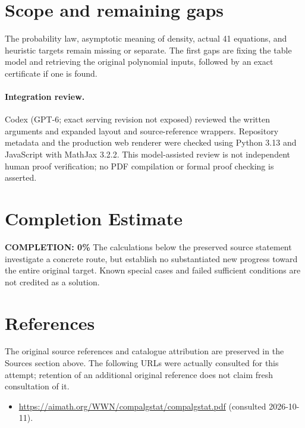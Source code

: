 \documentclass[11pt]{article}
\begin{document}
\section{Scope and remaining gaps}
The probability law, asymptotic meaning of density, actual 41 equations,
and heuristic targets remain missing or separate. The first gaps are fixing
the table model and retrieving the original polynomial inputs, followed by
an exact certificate if one is found.
\paragraph{Integration review.} Codex (GPT-6; exact serving revision not exposed) reviewed the written arguments and expanded layout and source-reference wrappers. Repository metadata and the production web renderer were checked using Python 3.13 and JavaScript with MathJax 3.2.2. This model-assisted review is not independent human proof verification; no PDF compilation or formal proof checking is asserted.

\section{Completion Estimate}
\noindent\textbf{COMPLETION: 0\%}
The calculations below the preserved source statement investigate a concrete route,
but establish no substantiated new progress toward the entire original target.
Known special cases and failed sufficient conditions are not credited as a solution.
\section{References}
The original source references and catalogue attribution are preserved in the
Sources section above. The following URLs were actually consulted for this attempt;
retention of an additional original reference does not claim fresh consultation of it.
\begin{itemize}
\item \url{https://aimath.org/WWN/compalgstat/compalgstat.pdf} (consulted 2026-10-11). 
\end{itemize}
\end{document}

